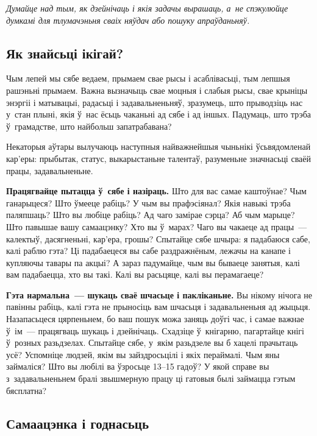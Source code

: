 \emph{Думайце над тым, як дзейнічаць і якія задачы вырашаць, а~не спэкулюйце думкамі для тлумачэньня сваіх няўдач або пошуку апраўданьняў.}

\subsection*{Як знайсьці ікігай?}

Чым лепей мы сябе ведаем, прымаем свае рысы і асаблівасьці, тым лепшыя рашэньні прымаем. Важна вызначыць свае моцныя і слабыя рысы, свае крыніцы энэргіі і матывацыі, радасьці і задавальненьняў, зразумець, што прыводзіць нас у~стан плыні, якія ў~нас ёсьць чаканьні ад сябе і ад іншых. Падумаць, што трэба ў~грамадстве, што найбольш запатрабавана? 


Некаторыя аўтары вылучаюць наступныя найважнейшыя чыньнікі ўсьвядомленай кар'еры: прыбытак, статус, выкарыстаньне талентаў, разуменьне значнасьці сваёй працы, задавальненьне.

\textbf{Працягвайце пытацца ў~сябе і назіраць.} Што для вас самае каштоўнае? Чым ганарыцеся? Што ўмееце рабіць? У чым вы прафэсіянал? Якія навыкі трэба паляпшаць? Што вы любіце рабіць? Ад чаго замірае сэрца? Аб чым марыце? Што павышае вашу самаацэнку? Хто вы ў~марах? Чаго вы чакаеце ад працы~--- калектыў, дасягненьні, кар'ера, грошы? Спытайце сябе шчыра: я падабаюся сабе, калі раблю гэта? Ці падабаецеся вы сабе раздражнёным, лежачы на канапе і купляючы тавары па акцыі? А зараз падумайце, чым вы бываеце занятыя, калі вам падабаецца, хто вы такі. Калі вы расьцяце, калі вы перамагаеце?

\textbf{Гэта нармальна~--- шукаць сваё шчасьце і пакліканьне.} Вы нікому нічога не павінны рабіць, калі гэта не прыносіць вам шчасьця і задавальненьня ад жыцьця. Назапасьцеся цярпеньнем, бо ваш пошук можа заняць доўгі час, і самае важнае ў~ім~--- працягваць шукаць і дзейнічаць. Схадзіце ў~кнігарню, пагартайце кнігі ў~розных разьдзелах. Спытайце сябе, у~якім разьдзеле вы б хацелі прачытаць усё? Успомніце людзей, якім вы зайздросьцілі і якіх пераймалі. Чым яны займаліся? Што вы любілі ва ўзросьце 13--15 гадоў? У якой справе вы з~задавальненьнем бралі звышмерную працу ці гатовыя былі займацца гэтым бясплатна?

\subsection*{Самаацэнка і годнасьць}


